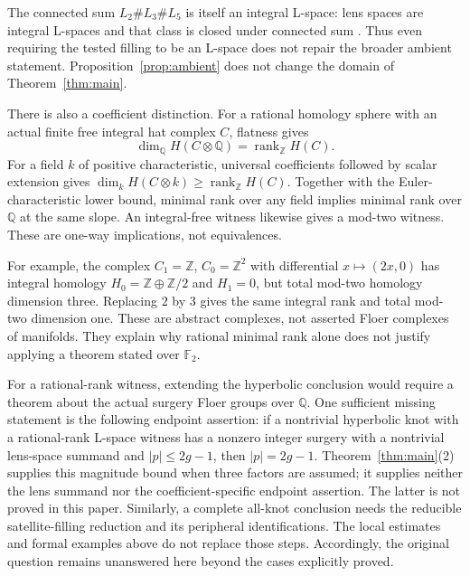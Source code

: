 \documentclass[11pt]{article}
\theoremstyle{remark}
\newcommand{\Z}{\mathbb Z}
\newcommand{\Q}{\mathbb Q}
\newcommand{\F}{\mathbb F_2}
\newcommand{\rk}{\operatorname{rank}}
\begin{document}
The connected sum $L_2\#L_3\#L_5$ is itself an integral L-space: lens spaces are integral L-spaces and that class is closed under connected sum \cite[paragraph following Definition~1.1]{OSLens}. Thus even requiring the tested filling to be an L-space does not repair the broader ambient statement. Proposition~\ref{prop:ambient} does not change the domain of Theorem~\ref{thm:main}.

There is also a coefficient distinction. For a rational homology sphere with an actual finite free integral hat complex $C$, flatness gives
\[
 \dim_{\Q}H(C\otimes\Q)=\rk_{\Z}H(C).
\]
For a field $k$ of positive characteristic, universal coefficients followed by scalar extension gives $\dim_kH(C\otimes k)\geq\rk_{\Z}H(C)$. Together with the Euler-characteristic lower bound, minimal rank over any field implies minimal rank over $\Q$ at the same slope. An integral-free witness likewise gives a mod-two witness. These are one-way implications, not equivalences.

For example, the complex $C_1=\Z$, $C_0=\Z^2$ with differential $x\mapsto(2x,0)$ has integral homology $H_0=\Z\oplus\Z/2$ and $H_1=0$, but total mod-two homology dimension three. Replacing $2$ by $3$ gives the same integral rank and total mod-two dimension one. These are abstract complexes, not asserted Floer complexes of manifolds. They explain why rational minimal rank alone does not justify applying a theorem stated over $\F$.

For a rational-rank witness, extending the hyperbolic conclusion would require a theorem about the actual surgery Floer groups over $\Q$. One sufficient missing statement is the following endpoint assertion: if a nontrivial hyperbolic knot with a rational-rank L-space witness has a nonzero integer surgery with a nontrivial lens-space summand and $|p|\leq2g-1$, then $|p|=2g-1$. Theorem~\ref{thm:main}(2) supplies this magnitude bound when three factors are assumed; it supplies neither the lens summand nor the coefficient-specific endpoint assertion. The latter is not proved in this paper. Similarly, a complete all-knot conclusion needs the reducible satellite-filling reduction and its peripheral identifications. The local estimates and formal examples above do not replace those steps. Accordingly, the original question remains unanswered here beyond the cases explicitly proved.
\end{document}
